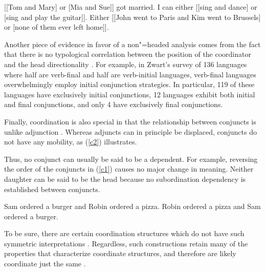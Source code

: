 \documentclass[output=paper
                ,modfonts
                ,nonflat
	        ,collection
	        ,collectionchapter
	        ,collectiontoclongg
 	        ,biblatex
                ,babelshorthands
                ,newtxmath
                ,draftmode
                ,colorlinks, citecolor=brown
]{./langsci/langscibook}
\begin{document}
{\begin{exe}
\ex
\begin{xlista}
\ex {}[[Tom and Mary] or [Mia and Sue]] got married.
\ex I can either [[sing and dance] or [sing and play the guitar]].
\ex Either [[John went to Paris and Kim went to Brussels] or
[none of them ever left home]].
\end{xlista}
\end{exe}

Another piece of evidence in favor of a non"=headed analysis comes from the fact that there is no typological correlation between the position of the coordinator and the head directionality \citep{zwart}. For example, in Zwart's  survey of 136 languages where half are verb-final and half
are verb-initial languages,  verb-final languages overwhelmingly employ initial conjunction strategies.
In particular, 119 of these languages have exclusively initial conjunctions, 12 languages exhibit both initial
and final conjunctions, and only 4 have exclusively final conjunctions. 


Finally, coordination is also special in that the relationship between conjuncts is unlike adjunction \citep{levinepostal}.\addpages
Whereas adjuncts can in principle be displaced, conjuncts do not have any mobility, as (\ref{c2}) illustrates.

\begin{exe}
\ex
\begin{xlista}
\end{xlista}\label{c2}
\end{exe}


\noindent
Thus, no conjunct can usually be said to be a dependent. For example,  reversing the order of the conjuncts in (\ref{c1}) causes no major change in meaning. Neither daughter can be said to be the head because no subordination dependency is established between conjuncts.

\begin{exe}
\ex
\begin{xlista}
\ex Sam ordered a burger and Robin ordered a pizza.
\ex Robin ordered a pizza and Sam ordered a burger.
\end{xlista}\label{c1}
\end{exe}

\noindent
To be sure, there are certain coordination structures which do not have such symmetric 
interpretations \citep{goldsmith,lakoff86,levinprince86}.
Regardless, such constructions retain many of the properties that characterize coordinate structures, and therefore are likely 
coordinate just the same \citep[Chapter~5]{kehler}.

}
\end{document}
